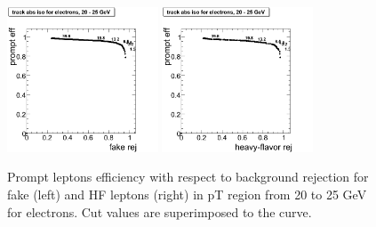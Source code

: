 \begin{figure}[htbp]
\begin{center}
 \includegraphics[width = 0.4\textwidth]{pictures/bkgdRej_sigEff/onlyTrack_elec_fake_ptCut3_ptCut4.png}
\includegraphics[width = 0.4\textwidth]{pictures/bkgdRej_sigEff/onlyTrack_elec_nonPrompt_ptCut3_ptCut4.png}
\caption{\small{Prompt leptons efficiency with respect to background 
rejection for fake (left) and HF leptons (right) in pT region
from 20 to 25 GeV for electrons. 
Cut values are superimposed to the curve.}\label{fig:rej_el4}}
\end{center}
\end{figure}

